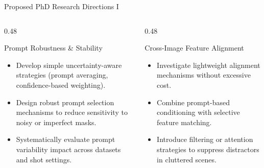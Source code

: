 \documentclass[aspectratio=169, 10pt]{beamer}
\begin{document}
\begin{frame}{Proposed PhD Research Directions I}
    \begin{columns}[T]
        \begin{column}{0.48\textwidth}
            \begin{block}{Prompt Robustness \& Stability}
                \footnotesize
                \begin{itemize}
                    \item Develop simple uncertainty-aware strategies (prompt averaging, confidence-based weighting).
                    \item Design robust prompt selection mechanisms to reduce sensitivity to noisy or imperfect masks.
                    \item Systematically evaluate prompt variability impact across datasets and shot settings.
                \end{itemize}
            \end{block}
        \end{column}
        \begin{column}{0.48\textwidth}
            \begin{block}{Cross-Image Feature Alignment}
                \footnotesize
                \begin{itemize}
                    \item Investigate lightweight alignment mechanisms without excessive cost.
                    \item Combine prompt-based conditioning with selective feature matching.
                    \item Introduce filtering or attention strategies to suppress distractors in cluttered scenes.
                \end{itemize}
            \end{block}
        \end{column}
    \end{columns}
\end{frame}
\end{document}
